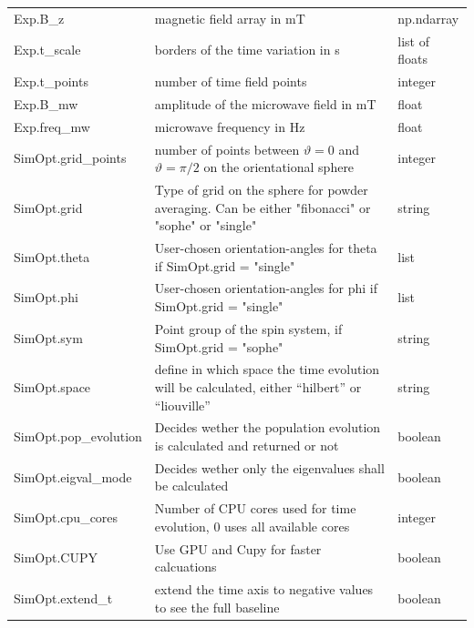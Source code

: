 \documentclass[a4paper,12pt]{scrartcl}
\begin{document}
\begin{xltabular}{\linewidth}{lXl}
\midrule

Exp.B\_z & magnetic field array in mT & np.ndarray \\
Exp.t\_scale & borders of the time variation in s & list of floats\\
Exp.t\_points & number of time field points & integer\\
Exp.B\_mw & amplitude of the microwave field in mT & float\\
Exp.freq\_mw & microwave frequency in Hz & float\\

\midrule

SimOpt.grid\_points & number of points between $\vartheta=0$ and $\vartheta=\pi/2$ on the orientational sphere& integer\\
SimOpt.grid & Type of grid on the sphere for powder averaging. Can be either "fibonacci" or "sophe" or "single" & string \\
SimOpt.theta & User-chosen orientation-angles for theta if SimOpt.grid = "single" & list \\
SimOpt.phi & User-chosen orientation-angles for phi if SimOpt.grid = "single" & list \\
SimOpt.sym & Point group of the spin system, if SimOpt.grid = "sophe" & string\\
SimOpt.space & define in which space the time evolution will be calculated, either \enquote{hilbert} or \enquote{liouville} & string\\
SimOpt.pop\_evolution & Decides wether the population evolution is calculated and returned or not & boolean\\
SimOpt.eigval\_mode & Decides wether only the eigenvalues shall be calculated & boolean\\
SimOpt.cpu\_cores & Number of CPU cores used for time evolution, 0 uses all available cores & integer \\
SimOpt.CUPY & Use GPU and Cupy for faster calcuations & boolean\\
SimOpt.extend\_t & extend the time axis to negative values to see the full baseline & boolean \\



\bottomrule

\end{xltabular}
\end{document}
